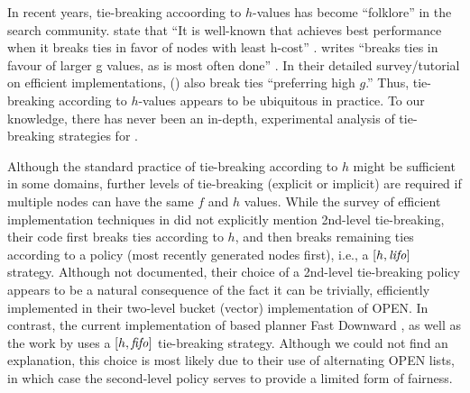 In recent years, tie-breaking accoording to $h$-values has become ``folklore'' in the search community.
\citeauthor{hansen2007anytime} state that ``It is well-known 
that \astar achieves best performance when it breaks ties
in favor of nodes with least h-cost'' \cite{hansen2007anytime}.
\citeauthor{holte2010common} writes ``\astar breaks ties in favour
of larger g values, as is most often done'' \cite[note that since $f=g+h$,
preferring large $g$ is equivalent to preferring smaller $h$]{holte2010common}.
In their detailed survey/tutorial on efficient \astar implementations,
\citeauthor{burns2012implementing} (\citeyear{burns2012implementing})
also break ties ``preferring high $g$.''
Thus, tie-breaking according to $h$-values appears
to be ubiquitous in practice.
To our knowledge, there has never been an in-depth, experimental analysis of tie-breaking strategies for \astar.

Although the standard practice of tie-breaking according to $h$ might be
sufficient in some domains, further levels of tie-breaking (explicit or
implicit) are required if multiple nodes can have the same $f$ and
$h$ values.
While the survey of efficient \astar implementation techniques in
\citeauthor{burns2012implementing} did not explicitly mention 2nd-level
tie-breaking, their code \cite{burnscode} first breaks ties according to $h$, and then
breaks remaining ties according to a \lifo policy (most recently
generated nodes first), i.e., a $[h,\mbox{\textit{lifo}}]$ strategy.
Although not documented, their choice of a \lifo 2nd-level tie-breaking policy appears to be a natural consequence of the fact it can be trivially, efficiently implemented in their two-level bucket (vector) implementation of OPEN.
In contrast, the current implementation of \sota \astar based planner Fast
Downward \cite{Helmert2006}, %
as well as 
the work by \cite{RogerH10} uses a $[h,\mbox{\textit{fifo}}]$ tie-breaking strategy.
Although we could not find an explanation, this choice is most likely due to their use of alternating OPEN lists, in which case the \fifo second-level policy serves to provide a limited form of fairness.


